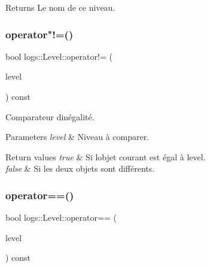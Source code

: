 \begin{DoxyReturn}{Returns}
Le nom de ce niveau. 
\end{DoxyReturn}
\mbox{\label{classlogs_1_1Level_a771a678978db8aec749e6d93491b1898}} 
\subsubsection{\texorpdfstring{operator"!=()}{operator!=()}}
{\footnotesize\ttfamily bool logs\+::\+Level\+::operator!= (\begin{DoxyParamCaption}\item[{const \hyperlink{classlogs_1_1Level}{Level} \&}]{level }\end{DoxyParamCaption}) const\hspace{0.3cm}{\ttfamily [inline]}}



Comparateur d\textquotesingle{}inégalité. 


\begin{DoxyParams}{Parameters}
{\em level} & Niveau à comparer. \\
\hline
\end{DoxyParams}

\begin{DoxyRetVals}{Return values}
{\em true} & Si l\textquotesingle{}objet courant est égal à {\ttfamily level}. \\
\hline
{\em false} & Si les deux objets sont différents. \\
\hline
\end{DoxyRetVals}
\mbox{\label{classlogs_1_1Level_a52add2597d2596d6114d1e395faeee0f}} 
\subsubsection{\texorpdfstring{operator==()}{operator==()}}
{\footnotesize\ttfamily bool logs\+::\+Level\+::operator== (\begin{DoxyParamCaption}\item[{const \hyperlink{classlogs_1_1Level}{Level} \&}]{level }\end{DoxyParamCaption}) const\hspace{0.3cm}{\ttfamily [inline]}}




